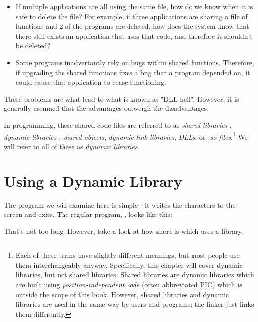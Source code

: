 \begin{itemize}\item If multiple applications are all using the same file, how do we know when it is safe to delete the file?  For example, if three applications are sharing a file of functions and 2 of the programs are deleted, how does the system know that there still exists an application that uses that code, and therefore it shouldn't be deleted? 
\item Some programs inadvertantly rely on bugs within shared functions.  Therefore, if upgrading the shared functions fixes a bug that a program depended on, it could cause that application to cease functioning. 
\end{itemize}

These problems are what lead to what is known as "DLL hell".
However, it is generally assumed that the advantages outweigh the disadvantages.

In programming, these shared code files are referred to as 
\emph{shared libraries} , \emph{dynamic libraries} , 
\emph{shared objects}, 
\emph{dynamic-link libraries}, 
\emph{DLLs}, or \emph{.so files}.\footnote{Each of these terms have slightly different meanings, but most people use them interchangeably anyway.  Specifically, this chapter will cover dynamic libraries, but not shared libraries.  Shared libraries are dynamic libraries which are built using \emph{position-independent code} (often abbreviated PIC) which is outside the scope of this book.  However, shared libraries and dynamic libraries are used in the same way by users and programs; the linker just links them differently.} We will refer to all of these as \emph{dynamic libraries}.

\section{Using a Dynamic Library}

The program we will examine here is simple - it writes the
characters  to the screen and
exits.  The regular program, , 
looks like this:

\begin{simpletyping}

\end{simpletyping}

That's not too long.  However, take a look at how short 
 is which uses a library:

